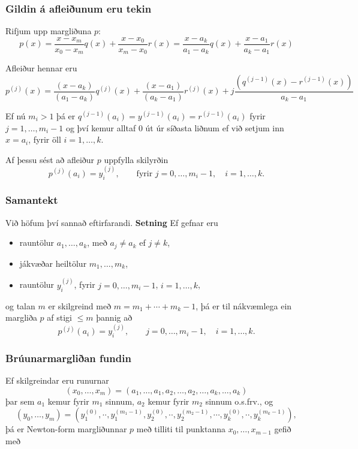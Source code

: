 \documentclass[icelandic,a4paper,12pt]{article}
\begin{document}
\subsubsection{Gildin á afleiðunum eru tekin} 
Rifjum upp margliðuna $p$:
$$
  p(x) = \frac{x-x_m}{x_0-x_m}q(x) 
  + \frac{x-x_0}{x_m-x_0}r(x)
  = \frac{x-a_k}{a_1-a_k}q(x)
  + \frac{x-a_1}{a_k-a_1}r(x)
$$

\pause
Afleiður hennar eru
\begin{equation*}
  p^{(j)}(x) = \frac{(x-a_k)}{(a_1-a_k)}q^{(j)}(x)
  + \frac{(x-a_1)}{(a_k-a_1)}r^{(j)}(x)
  + j \frac{\left( q^{(j-1)}(x)-r^{(j-1)}(x)\right)}{a_k-a_1}
\end{equation*}

\pause
\smallskip
Ef nú $m_i > 1$ þá er $q^{(j-1)}(a_i) = y^{(j-1)}(a_i) =
r^{(j-1)}(a_i)$  fyrir $j = 1, \ldots, m_i-1$ og því kemur alltaf 
$0$ út úr síðasta liðnum ef við setjum inn $x = a_i$, fyrir öll 
$i = 1, \ldots, k$.

\pause
\smallskip
Af þessu sést að afleiður $p$ uppfylla skilyrðin
$$
  p^{(j)}(a_i) = y^{(j)}_i, \qquad \text{fyrir } j=0,\ldots,m_i-1, 
  \quad i=1,\ldots,k.
$$


\subsubsection{Samantekt} 
Við höfum því sannað eftirfarandi.
\pause
\textbf{Setning}
Ef gefnar eru 
\begin{itemize}
 \item rauntölur $a_1,\dots,a_k$, með $a_j\neq a_k$ ef $j\neq k$, 
 \item jákvæðar heiltölur $m_1,\dots,m_k$,  
 \item rauntölur $y_i^{(j)}$, fyrir $j=0,\dots, m_i-1$, $i=1,\dots,k$, 
\end{itemize}
og talan $m$ er skilgreind
með $m=m_1+\cdots+m_k-1$, þá er til nákvæmlega ein margliða $p$
af stigi $\leq m$ þannig að
$$
p^{(j)}(a_i)=y_i^{(j)}, \qquad j=0,\dots, m_i-1, \quad i=1,\dots,k. 
$$  



\subsubsection{Brúunarmargliðan fundin}
Ef skilgreindar eru runurnar 
$$
(x_0,\dots,x_m)=(a_1,\dots,a_1,a_2,\dots,a_2,\dots,a_k,\dots,a_k)
$$
þar sem $a_1$ kemur fyrir $m_1$ sinnum, $a_2$ kemur fyrir $m_2$ sinnum
o.s.frv., og
$$
(y_0,\dots,y_m)=(y_1^{(0)},\cdot\cdot,y_1^{(m_1-1)},y_2^{(0)},\cdot\cdot,y_2^{(m_2-1)},
\cdots,y_k^{(0)},\cdot\cdot,y_k^{(m_k-1)}),
$$
þá er Newton-form margliðunnar $p$ með tilliti til punktanna
$x_0,\dots,x_{m-1}$ gefið með 
\end{document}
